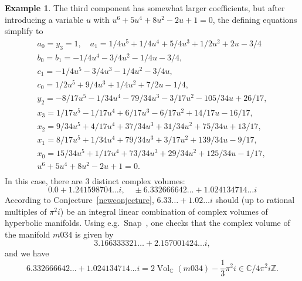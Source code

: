 \documentclass[11pt]{amsart}
\theoremstyle{definition}
\newtheorem{example}[theorem]{Example}
\numberwithin{equation}{section}
\DeclareMathOperator{\Vol}{Vol}
\newcommand{\C}{\mathbb C}
\newcommand{\Z}{\mathbb Z}
\begin{document}
\begin{example}
The third component has somewhat larger coefficients, but after introducing 
a variable $u$ with $u^6 + 5u^4 + 8u^2 - 2u + 1=0$, the defining equations 
simplify to
\begin{equation}
\begin{gathered}
a_0=y_3=1,\quad a_1=1/4u^5+1/4u^4+5/4u^3+1/2u^2+2u-3/4\\
b_0=b_1=-1/4u^4-3/4u^2-1/4u-3/4,\\
c_1=-1/4u^5-3/4u^3-1/4u^2-3/4u,\\
c_0=1/2u^5+9/4u^3+1/4u^2+7/2u-1/4,\\
y_2=-8/17u^5-1/34u^4-79/34u^3-3/17u^2-105/34u+26/17,\\
x_3=1/17u^5-1/17u^4+6/17u^3-6/17u^2+14/17u-16/17,\\
x_2=9/34u^5+4/17u^4+37/34u^3+31/34u^2+75/34u+13/17,\\
x_1=8/17u^5+1/34u^4+79/34u^3+3/17u^2+139/34u-9/17,\\
x_0=15/34u^5+1/17u^4+73/34u^3+29/34u^2+125/34u-1/17,\\
u^6 + 5u^4 + 8u^2 - 2u + 1=0.\\
\end{gathered}
\end{equation}
In this case, there are $3$ distinct complex volumes:
\begin{equation}
0.0+1.241598704\dots i,\quad \pm 6.332666642\ldots+1.024134714\dots i
\end{equation}
According to Conjecture~\ref{newconjecture}, $6.33\dots + 1.02\dots i$ 
should (up to rational multiples of $\pi^2i$) be an integral linear 
combination of complex volumes of hyperbolic manifolds. 
Using e.g.~Snap~\cite{snapprogram}, one checks that the complex volume of 
the manifold $m034$ is given by
\begin{equation}
3.166333321\ldots + 2.157001424\dots i,
\end{equation}
and we have
\begin{equation}
6.332666642\ldots+1.024134714\dots i=2\Vol_\C(m034)
-\frac{1}{3}\pi^2i\in\C/4\pi^2i\Z.
\end{equation}
\end{example}
\end{document}
